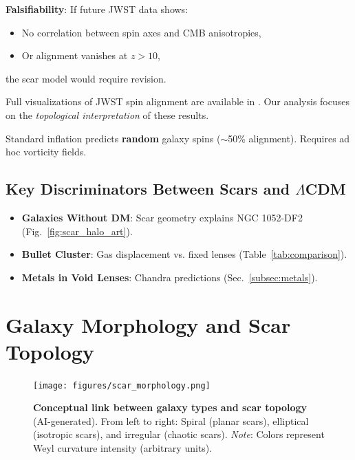 \documentclass{article}
\begin{document}
\textbf{Falsifiability}:  
If future JWST data shows:  
\begin{itemize}  
    \item No correlation between spin axes and CMB anisotropies,  
    \item Or alignment vanishes at $z > 10$,  
\end{itemize}  
the scar model would require revision. 

\begin{tcolorbox}[colback=boxnormal,colframe=blue!50!black,title=Data Availability]  
Full visualizations of JWST spin alignment are available in \cite{Shamir2025}. Our analysis focuses on the \textit{topological interpretation} of these results.  
\end{tcolorbox}

 \begin{tcolorbox}[
 colback=boximpact,
 colframe=red!75!black,
title=$\Lambda$CDM Conflict]  
Standard inflation predicts \textbf{random} galaxy spins ($\sim$50\% alignment). Requires ad hoc vorticity fields.  
\end{tcolorbox}


\subsection{Key Discriminators Between Scars and $\Lambda$CDM }
       \begin{itemize}
           \item \textbf{Galaxies Without DM}: Scar geometry explains NGC 1052-DF2 (Fig.~\ref{fig:scar_halo_art}).
           \item \textbf{Bullet Cluster}: Gas displacement vs. fixed lenses (Table~\ref{tab:comparison}).
           \item \textbf{Metals in Void Lenses}: Chandra predictions (Sec.~\ref{subsec:metals}).
       \end{itemize}



\section{Galaxy Morphology and Scar Topology}  
\label{sec:morphology}  

\begin{figure}[H]  
  \centering  
  \texttt{[image: figures/scar\_morphology.png]}  
  \caption{  
    \textbf{Conceptual link between galaxy types and scar topology} (AI-generated).  
    From left to right: Spiral (planar scars), elliptical (isotropic scars), and irregular (chaotic scars).  
    \textit{Note}: Colors represent Weyl curvature intensity (arbitrary units).  
  }  
  \label{fig:scar_morphology}  
\end{figure}  
\end{document}
